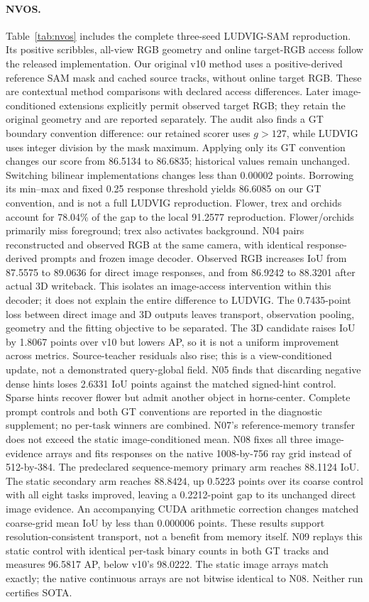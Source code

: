 \paragraph{NVOS.}
Table~\ref{tab:nvos} includes the complete three-seed LUDVIG-SAM reproduction.
Its positive scribbles, all-view RGB geometry and online target-RGB access
follow the released implementation. Our original v10 method uses a
positive-derived reference SAM mask and cached source tracks, without online
target RGB. These are contextual method comparisons with declared access
differences. Later image-conditioned extensions explicitly permit observed
target RGB; they retain the original geometry and are reported separately.
The audit also finds a GT boundary convention difference: our retained scorer
uses $g>127$, while LUDVIG uses integer division by the mask maximum. Applying
only its GT convention changes our score from 86.5134 to 86.6835; historical
values remain unchanged. Switching bilinear implementations changes less than
0.00002 points. Borrowing its min--max and fixed 0.25 response threshold yields
86.6085 on our GT convention, and is not a full LUDVIG reproduction. Flower,
trex and orchids account for 78.04\% of the gap to the local 91.2577 reproduction.
Flower/orchids primarily miss foreground; trex also activates background.
N04 pairs reconstructed and observed RGB at the same camera, with identical
response-derived prompts and frozen image decoder. Observed RGB increases
IoU from 87.5575 to 89.0636 for direct image responses, and from 86.9242 to
88.3201 after actual 3D writeback. This isolates an image-access intervention
within this decoder; it does not explain the entire difference to LUDVIG.
The 0.7435-point loss between direct image and 3D outputs leaves transport,
observation pooling, geometry and the fitting objective to be separated.
The 3D candidate raises IoU by 1.8067 points over v10 but lowers AP, so it is
not a uniform improvement across metrics. Source-teacher residuals also rise;
this is a view-conditioned update, not a demonstrated query-global field.
N05 finds that discarding negative dense hints loses 2.6331 IoU points against
the matched signed-hint control. Sparse hints recover flower but admit another
object in horns-center. Complete prompt controls and both GT conventions are
reported in the diagnostic supplement; no per-task winners are combined.
N07's reference-memory transfer does not exceed the static image-conditioned
mean. N08 fixes all three image-evidence arrays and fits responses on the native
1008-by-756 ray grid instead of 512-by-384. The predeclared sequence-memory
primary arm reaches 88.1124 IoU. The static secondary arm reaches 88.8424,
up 0.5223 points over its coarse control with all eight tasks improved, leaving
a 0.2212-point gap to its unchanged direct image evidence. An accompanying
CUDA arithmetic correction changes matched coarse-grid mean IoU by less than
0.000006 points. These results support resolution-consistent transport, not
a benefit from memory itself. N09 replays this static control with identical
per-task binary counts in both GT tracks and measures 96.5817 AP, below v10's
98.0222. The static image arrays match exactly; the native continuous arrays
are not bitwise identical to N08. Neither run certifies SOTA.

